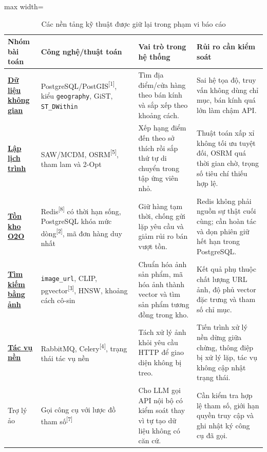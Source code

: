 \documentclass[12pt, a4paper]{article}
\begin{document}
\begin{table}[H]
\centering
\renewcommand{\arraystretch}{1.35}
\small
\begin{adjustbox}{max width=\textwidth}
\begin{tabular}{|>{\raggedright\arraybackslash}p{3.1cm}|>{\raggedright\arraybackslash}p{4.0cm}|>{\raggedright\arraybackslash}p{4.6cm}|>{\raggedright\arraybackslash}p{3.7cm}|}
\hline
\textbf{Nhóm bài toán} & \textbf{Công nghệ/thuật toán} & \textbf{Vai trò trong hệ thống} & \textbf{Rủi ro cần kiểm soát} \\ \hline
\hyperref[sec:tech_spatial]{\textbf{Dữ liệu không gian}} & PostgreSQL/PostGIS\textsuperscript{[1]}, kiểu \texttt{geography}, GiST, \texttt{ST\_DWithin} & Tìm địa điểm/cửa hàng theo bán kính và sắp xếp theo khoảng cách. & Sai hệ tọa độ, truy vấn không dùng chỉ mục, bán kính quá lớn làm chậm API. \\ \hline
\hyperref[sec:tech_planner]{\textbf{Lập lịch trình}} & SAW/MCDM, OSRM\textsuperscript{[5]}, tham lam và 2-Opt & Xếp hạng điểm đến theo sở thích rồi sắp thứ tự di chuyển trong tập ứng viên nhỏ. & Thuật toán xấp xỉ không tối ưu tuyệt đối, OSRM quá thời gian chờ, trọng số tiêu chí thiếu hợp lệ. \\ \hline
\hyperref[sec:tech_inventory]{\textbf{Tồn kho O2O}} & Redis\textsuperscript{[8]} có thời hạn sống, PostgreSQL khóa mức dòng\textsuperscript{[2]}, mã đơn hàng duy nhất & Giữ hàng tạm thời, chống gửi lặp yêu cầu và giảm rủi ro bán vượt tồn. & Redis không phải nguồn sự thật cuối cùng; cần hoàn tác và dọn phiên giữ hết hạn trong PostgreSQL. \\ \hline
\hyperref[sec:tech_vision]{\textbf{Tìm kiếm bằng ảnh}} & \texttt{image\_url}, CLIP, pgvector\textsuperscript{[3]}, HNSW, khoảng cách cô-sin & Chuẩn hóa ảnh sản phẩm, mã hóa ảnh thành vector và tìm sản phẩm tương đồng trong kho. & Kết quả phụ thuộc chất lượng URL ảnh, độ phủ vector đặc trưng và tham số chỉ mục. \\ \hline
\hyperref[sec:tech_celery]{\textbf{Tác vụ nền}} & RabbitMQ, Celery\textsuperscript{[4]}, trạng thái tác vụ nền & Tách xử lý ảnh khỏi yêu cầu HTTP để giao diện không bị treo. & Tiến trình xử lý nền dừng giữa chừng, thông điệp bị xử lý lặp, tác vụ không cập nhật trạng thái. \\ \hline
Trợ lý ảo & Gọi công cụ với lược đồ tham số\textsuperscript{[7]} & Cho LLM gọi API nội bộ có kiểm soát thay vì tự tạo dữ liệu không có căn cứ. & Cần kiểm tra hợp lệ tham số, giới hạn quyền truy cập và ghi nhật ký công cụ đã gọi. \\ \hline
\end{tabular}
\end{adjustbox}
\caption{Các nền tảng kỹ thuật được giữ lại trong phạm vi báo cáo}
\label{tab:selected_technologies}
\end{table}
\end{document}
